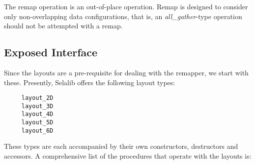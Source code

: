 \documentclass[]{report}   %
\begin{document}
The remap operation is an out-of-place operation. Remap is designed to consider only non-overlapping data configurations, that is, an \emph{all\_gather}-type operation should not be attempted with a remap.







\subsection{Exposed Interface}
Since the layouts are a pre-requisite for dealing with the remapper, we start with these. Presently, Selalib offers the following layout types:

\begin{verbatim}
     layout_2D
     layout_3D
     layout_4D
     layout_5D
     layout_6D
\end{verbatim}



These types are each accompanied by their own constructors, destructors and accessors. A comprehensive list of the procedures that operate with the layouts is:
\end{document}
